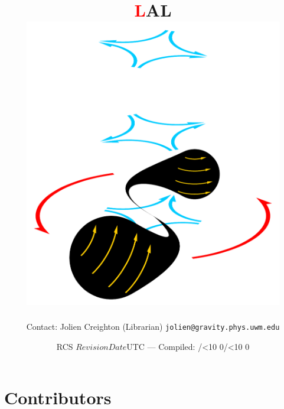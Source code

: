 \documentclass[oneside]{book}
\def\rcs#1{\def\next##1#1{\mbox{##1}}\next}
\begin{document}
\frontmatter


\title{
\sffamily\bfseries\Huge
\textcolor{red}{\lsdfont L}AL
\hspace{-2em}
\\[\bigskipamount]
\includegraphics[height=5in]{merger}
}
\author{Contact: Jolien Creighton (Librarian) \texttt{jolien@gravity.phys.uwm.edu}}
\date{RCS \rcs$Revision$\rcs$Date$UTC --- Compiled:
\number\year/\ifnum\month<10 0\fi\number\month/\ifnum\day<10 0\fi\number\day}

\maketitle

\section*{Contributors}
\begin{verse}

\end{verse}
\end{document}
